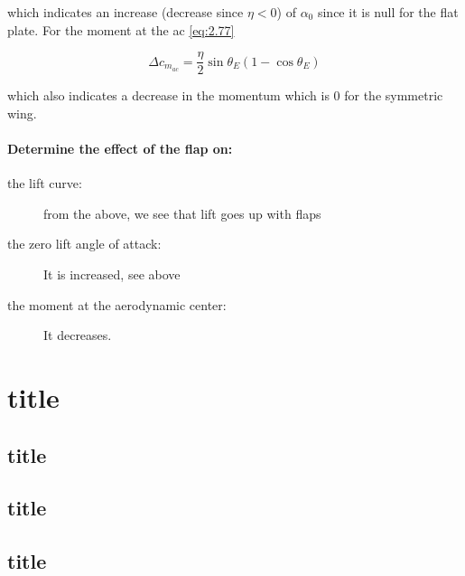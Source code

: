 \documentclass[british,french,11pt, a4paper, openany]{article}
\begin{document}
	which indicates an increase (decrease since $\eta <0$) of $\alpha _0$ since it is null for the flat plate. For the moment at the ac \eqref{eq:2.77}
	
	\begin{equation}
	\Delta c_{m_{ac}} = \frac{\eta }{2} \sin \theta _E (1- \cos \theta _E)
	\end{equation}
	
	which also indicates a decrease in the momentum which is 0 for the symmetric wing.
\paragraph{Determine the effect of the flap on:}
\begin{description}
	\item[the lift curve:] from the above, we see that lift goes up with flaps
	\item[the zero lift angle of attack:] It is increased, see above
	\item[the moment at the aerodynamic center:] It decreases.
\end{description}



\section{title}
\subsection{title}
\subsection{title}
\subsection{title}

\end{document}

